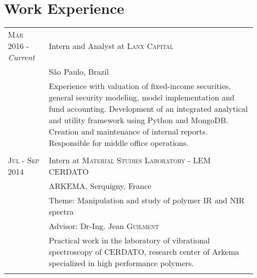 \documentclass[a4paper,10pt]{article}
\begin{document}
{\begin{tabular}{R{3.5cm} p{10cm}}



\end{tabular}


\section{Work Experience}

\vspace*{3pt}
\hspace*{-12pt}
\begin{tabular}{R{3.5cm} p{10cm}}


\textsc{Mar 2016 - } \emph{Current} & Intern and Analyst at \textsc{Lanx Capital} \\& São Paulo, Brazil\\ &
\footnotesize{Experience with valuation of fixed-income securities, general security modeling, model implementation and
fund accounting. Development of an integrated analytical and utility framework using Python and MongoDB. Creation and
maintenance of internal reports. Responsible for middle office operations.}\\  \\



\textsc{Jul - Sep 2014} & Intern at \textsc{Material Studies Laboratory - LEM CERDATO} \\& \textsc{ARKEMA}, Serquigny,
France\\ & Theme: Manipulation and study of polymer IR and NIR spectra \\&  \small Advisor: Dr-Ing. Jean
\textsc{Guilment}\\& \footnotesize{Practical work in the laboratory of vibrational spectroscopy of CERDATO, research
center of Arkema specialized in high performance polymers.}\\  \\



\end{tabular}}
\end{document}
